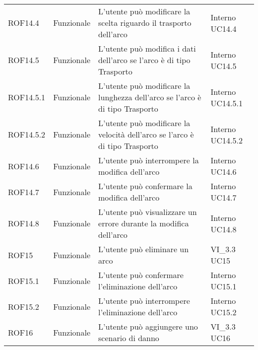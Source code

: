 \begin{longtable}{p{2cm}!{\VRule[1pt]}p{2cm}!{\VRule[1pt]}p{5cm}!{\VRule[1pt]}p{1.5cm}}
ROF14.4&Funzionale\newline  & L'utente può modificare la scelta riguardo il trasporto dell'arco & Interno \newline UC14.4
 \\
ROF14.5&Funzionale\newline  & L'utente può modifica i dati dell'arco se l'arco è di tipo Trasporto & Interno \newline UC14.5
 \\
ROF14.5.1&Funzionale\newline  & L'utente può modificare la lunghezza dell'arco se l'arco è di tipo Trasporto & Interno \newline UC14.5.1
 \\
ROF14.5.2&Funzionale\newline  & L'utente può modificare la velocità dell'arco se l'arco è di tipo Trasporto & Interno \newline UC14.5.2
 \\
ROF14.6&Funzionale\newline  & L'utente può interrompere la modifica dell'arco & Interno \newline UC14.6
 \\
ROF14.7&Funzionale\newline  & L'utente può confermare la modifica dell'arco & Interno \newline UC14.7
 \\
ROF14.8&Funzionale\newline  & L'utente può visualizzare un errore durante la modifica dell'arco & Interno \newline UC14.8
 \\
ROF15&Funzionale\newline  & L'utente può eliminare un arco & VI_3.3 \newline UC15
 \\
ROF15.1&Funzionale\newline  & L'utente può confermare l'eliminazione dell'arco & Interno \newline UC15.1
 \\
ROF15.2&Funzionale\newline  & L'utente può interrompere l'eliminazione dell'arco & Interno \newline UC15.2
 \\
ROF16&Funzionale\newline  & L'utente può aggiungere uno scenario di danno & VI_3.3 \newline UC16
 \\

\end{longtable}
